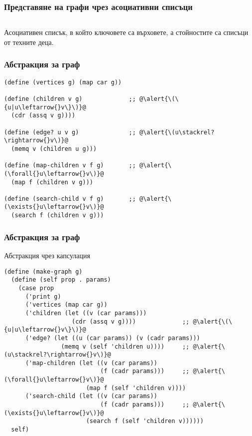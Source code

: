 \documentclass{beamer}
\begin{document}
\begin{frame}[fragile]
  \frametitle{Представяне на графи чрез асоциативни списъци}

  \begin{columns}[t,onlytextwidth]
    \begin{column}{0.7\textwidth}
      \begin{center}
        \samplegraph
      \end{center}
    \end{column}
    \begin{column}{0.3\textwidth}
\begin{semiverbatim}
 \end{semiverbatim}
    \end{column}
  \end{columns}
  \vspace{1em}
  Асоциативен списък, в който \alert{ключовете} са върховете, а \alert{стойностите} са списъци от техните деца.
\end{frame}

\begin{frame}[fragile]
  \frametitle{Абстракция за граф}

\begin{lstlisting}
(define (vertices g) (map car g))

(define (children v g)             ;; @\alert{\(\{u|u\leftarrow{}v\}\)}@
  (cdr (assq v g))))

(define (edge? u v g)              ;; @\alert{\(u\stackrel?\rightarrow{}v\)}@
  (memq v (children u g)))

(define (map-children v f g)       ;; @\alert{\(\forall{}u\leftarrow{}v\)}@
  (map f (children v g)))

(define (search-child v f g)       ;; @\alert{\(\exists{}u\leftarrow{}v\)}@
  (search f (children v g)))
\end{lstlisting}
\end{frame}

\begin{frame}[fragile]
  \frametitle{Абстракция за граф}

  Абстракция чрез капсулация
  \small
\begin{lstlisting}
(define (make-graph g)
  (define (self prop . params)
    (case prop
      ('print g)
      ('vertices (map car g))
      ('children (let ((v (car params)))
                   (cdr (assq v g))))             ;; @\alert{\(\{u|u\leftarrow{}v\}\)}@
      ('edge? (let ((u (car params)) (v (cadr params)))
                (memq v (self 'children u))))     ;; @\alert{\(u\stackrel?\rightarrow{}v\)}@
      ('map-children (let ((v (car params))
                           (f (cadr params)))     ;; @\alert{\(\forall{}u\leftarrow{}v\)}@
                       (map f (self 'children v))))
      ('search-child (let ((v (car params))
                           (f (cadr params)))     ;; @\alert{\(\exists{}u\leftarrow{}v\)}@
                       (search f (self 'children v))))))
  self)
\end{lstlisting}
\end{frame}
\end{document}

